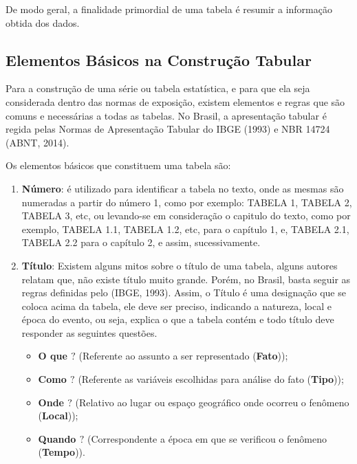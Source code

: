De modo geral, a finalidade primordial de uma tabela é resumir a informação obtida dos dados.

\subsection{Elementos Básicos na Construção Tabular}

\inic Para a construção de uma série ou tabela estatística, e para que ela seja considerada dentro das normas de exposição, existem elementos e regras que são comuns e necessárias a todas as tabelas. No Brasil, a apresentação tabular é regida pelas Normas de Apresentação Tabular do IBGE (1993) e NBR 14724 (ABNT, 2014).\vskip0.3cm


Os elementos básicos que constituem uma tabela são:

\begin{enumerate}
  \item \textbf{Número}: é utilizado para identificar a tabela no texto, onde as mesmas são numeradas a partir do número 1, como por exemplo: TABELA 1, TABELA 2, TABELA 3, etc, ou levando-se em consideração o capitulo do texto, como por exemplo, TABELA 1.1, TABELA 1.2, etc, para o capítulo 1, e, TABELA 2.1, TABELA 2.2 para o capítulo 2, e assim, sucessivamente.
  \item \textbf{Título}: Existem alguns mitos sobre o título de uma tabela, alguns autores relatam que, não existe título muito grande. Porém, no Brasil, basta seguir as regras definidas pelo (IBGE, 1993). Assim, o Título é uma designação que se coloca acima da tabela, ele deve ser preciso,
  indicando a natureza, local e época do evento, ou seja, explica o que a tabela contém e todo título deve responder as seguintes questões.

\begin{itemize}
  \item \textbf{O que $?$}  (Referente ao assunto a ser representado (\textbf{Fato}));
  \item \textbf{Como $?$}  (Referente as variáveis escolhidas para análise do fato (\textbf{Tipo}));
   \item \textbf{Onde $?$}   (Relativo ao lugar ou espaço geográfico onde ocorreu o fenômeno (\textbf{Local}));
    \item \textbf{Quando $?$} (Correspondente a época em que se verificou o fenômeno (\textbf{Tempo})).
\end{itemize}


\end{enumerate}
